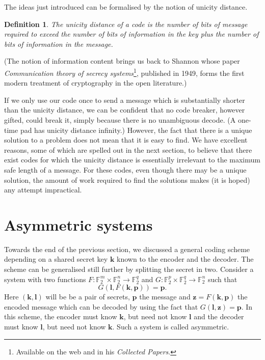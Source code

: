\documentclass[12pt,a4paper]{article}
\theoremstyle{plain}
\newtheorem{definition}[theorem]{Definition}
\theoremstyle{definition}
\begin{document}
    The ideas just introduced can be formalised
    by the notion of unicity distance.
    \begin{definition}
        \label{unicity}
        The \emph{unicity distance}
        of a code is the number of bits of message
        required to exceed the number of bits of
        information in the key plus the number
        of bits of information in the message.
    \end{definition}

    (The notion of information content
    brings us back to Shannon whose paper
    \emph{Communication theory of secrecy systems}\footnote{Available
    on the web and in his \emph{Collected Papers}.},
    published in 1949, forms the first modern treatment
    of cryptography in the open literature.)

    If we only use our code once to send a message
    which is substantially shorter than the unicity
    distance, we can be confident that no code breaker,
    however gifted, could break it, simply because
    there is no unambiguous decode.
    (A one-time pad has unicity distance infinity.)
    However, the fact that there is a unique solution
    to a problem does not mean that it is easy
    to find.
    We have excellent reasons, some of which
    are spelled out in the next section, to believe that
    there exist codes for which the unicity distance
    is essentially irrelevant to the maximum safe length
    of a message. For these codes, even though there may
    be a unique solution, the amount of work required
    to find the solutions makes (it is hoped) any
    attempt impractical.
    \section{Asymmetric systems}\label{S;symmetric} Towards the end
    of the previous section, we discussed a general
    coding scheme depending on a shared secret
    key ${\mathbf k}$ known to the encoder
    and the decoder. The scheme can be generalised
    still further by splitting the secret in two.
    Consider a system
    with two functions
    $F:{\mathbb F}_{2}^{m}\times{\mathbb F}_{2}^{n}
    \rightarrow{\mathbb F}_{2}^{q}$ and
    $G:{\mathbb F}_{2}^{p}\times{\mathbb F}_{2}^{q}
    \rightarrow{\mathbb F}_{2}^{n}$
    such that
    \[G({\mathbf l},F({\mathbf k},{\mathbf p}))={\mathbf p}.\]
    Here $({\mathbf k},{\mathbf l})$ will be
    be a pair of secrets, ${\mathbf p}$ the message and
    ${\mathbf z}=F({\mathbf k},{\mathbf p})$ the
    encoded message which can be decoded by
    using the fact that $G({\mathbf l},{\mathbf z})
    ={\mathbf p}$. In this scheme, the encoder
    must know ${\mathbf k}$, but need not know ${\mathbf l}$
    and the decoder must know ${\mathbf l}$,
    but need not know ${\mathbf k}$. Such a system
    is called asymmetric.
\end{document}
